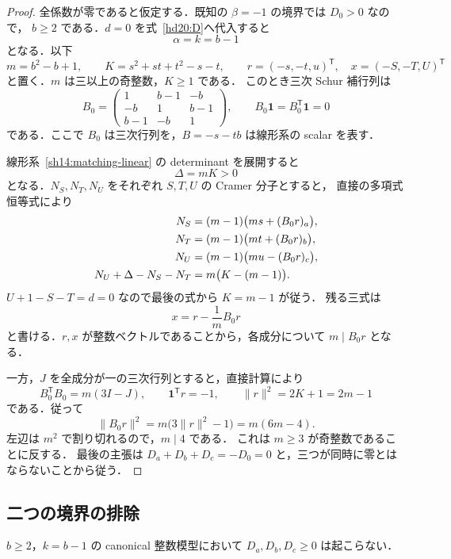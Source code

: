 \begin{proof}
全係数が零であると仮定する．既知の $\beta=-1$ の境界では $D_0>0$ なので，
$b\ge2$ である．$d=0$ を式~\eqref{hd20:D}へ代入すると
\[
 \alpha=k=b-1
\]
となる．以下
\[
 m=b^2-b+1,\qquad
 K=s^2+st+t^2-s-t,\qquad
 r=(-s,-t,u)^{\mathsf T},\quad x=(-S,-T,U)^{\mathsf T}
\]
と置く．$m$ は三以上の奇整数，$K\ge1$ である．
このとき三次 Schur 補行列は
\[
 B_0=\begin{pmatrix}
 1&b-1&-b\\
 -b&1&b-1\\
 b-1&-b&1
 \end{pmatrix},\qquad
 B_0\mathbf1=B_0^{\mathsf T}\mathbf1=0
\]
である．ここで $B_0$ は三次行列を，$B=-s-tb$ は線形系の scalar を表す．

線形系~\eqref{sh14:matching-linear} の determinant を展開すると
\[
 \Delta=mK>0
\]
となる．$N_S,N_T,N_U$ をそれぞれ $S,T,U$ の Cramer 分子とすると，
直接の多項式恒等式により
\begin{align}
 N_S&=(m-1)\bigl(ms+(B_0r)_a\bigr),\notag\\
 N_T&=(m-1)\bigl(mt+(B_0r)_b\bigr),\notag\\
 N_U&=(m-1)\bigl(mu-(B_0r)_c\bigr),\label{hd20:zero-cramer}\\
 N_U+\Delta-N_S-N_T&=m\bigl(K-(m-1)\bigr).\notag
\end{align}
$U+1-S-T=d=0$ なので最後の式から $K=m-1$ が従う．
残る三式は
\begin{equation}\label{hd20:zero-rotation}
 x=r-\frac1m B_0r
\end{equation}
と書ける．$r,x$ が整数ベクトルであることから，各成分について $m\mid B_0r$ となる．

一方，$J$ を全成分が一の三次行列とすると，直接計算により
\[
 B_0^{\mathsf T}B_0=m(3I-J),\qquad
 \mathbf1^{\mathsf T}r=-1,\qquad
 \lVert r\rVert^2=2K+1=2m-1
\]
である．従って
\[
 \lVert B_0r\rVert^2
 =m\bigl(3\lVert r\rVert^2-1\bigr)=m(6m-4).
\]
左辺は $m^2$ で割り切れるので，$m\mid4$ である．
これは $m\ge3$ が奇整数であることに反する．
最後の主張は $D_a+D_b+D_c=-D_0=0$ と，三つが同時に零とはならないことから従う．
\end{proof}

\subsection{二つの境界の排除}

\begin{lemma}[境界からの同時非負性は生じない]
\label{hd20:k-boundary}
$b\ge2$，$k=b-1$ の canonical 整数模型において
$D_a,D_b,D_c\ge0$ は起こらない．
\end{lemma}

